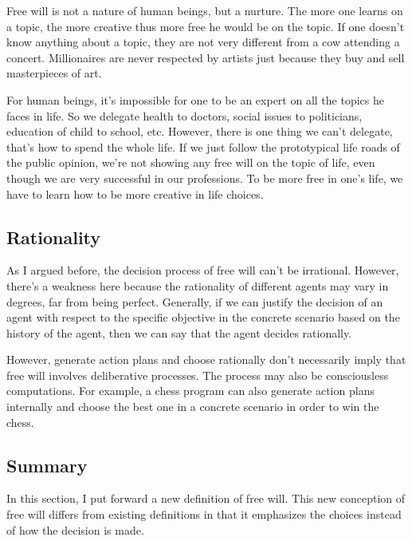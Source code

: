Free will is not a nature of human beings, but a nurture. The more one learns on a topic, the more creative thus more free he would be on the topic. If one doesn't know anything about a topic, they are not very different from a cow attending a concert. Millionaires are never respected by artists just because they buy and sell masterpieces of art.

For human beings, it's impossible for one to be an expert on all the topics he faces in life. So we delegate health to doctors, social issues to politicians, education of child to school, etc. However, there is one thing we can't delegate, that's how to spend the whole life. If we just follow the prototypical life roads of the public opinion, we're not showing any free will on the topic of life, even though we are very successful in our professions. To be more free in one's life, we have to learn how to be more creative in life choices.

\subsection{Rationality}

As I argued before, the decision process of free will can't be irrational. However, there’s a weakness here because the rationality of different agents may vary in degrees, far from being perfect. Generally, if we can justify the decision of an agent with respect to the specific objective in the concrete scenario based on the history of the agent, then we can say that the agent decides rationally.

However, generate action plans and choose rationally don’t necessarily imply that free will involves deliberative processes. The process may also be consciousless computations. For example, a chess program can also generate action plans internally and choose the best one in a concrete scenario in order to win the chess.

\subsection{Summary}

In this section, I put forward a new definition of free will. This new conception of free will differs from existing definitions in that it emphasizes the choices instead of how the decision is made.


